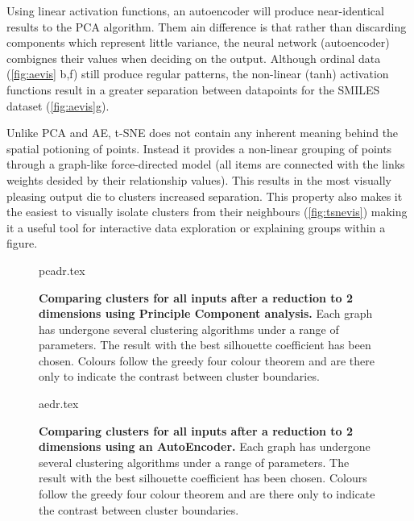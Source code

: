 Using linear activation functions, an autoencoder will produce near-identical results to the PCA algorithm. Them ain difference is that rather than discarding components which represent little variance, the neural network (autoencoder) combignes their values when deciding on the output. Although ordinal data (\autoref{fig:aevis} b,f) still produce regular patterns, the non-linear (tanh) activation functions result in a greater separation between datapoints for the SMILES dataset (\autoref{fig:aevis}g).

Unlike PCA and AE, t-SNE does not contain any inherent meaning behind the spatial potioning of points. Instead it provides a non-linear grouping of points through a graph-like force-directed model (all items are connected with the links weights desided by their relationship values). This results in the most visually pleasing output die to clusters increased separation. This property also  makes it the easiest to visually isolate clusters from their neighbours (\autoref{fig:tsnevis}) making it a useful tool for interactive data exploration or explaining groups within a figure.


\begin{landscape}
\begin{figure}[H]
    {pcadr.tex}
    \caption{\textbf{Comparing clusters for all inputs after a reduction to 2 dimensions using Principle Component analysis.}
    Each graph has undergone several clustering algorithms under a range of parameters. The result with the best silhouette coefficient has been chosen. Colours follow the greedy four colour theorem and are there only to indicate the contrast between cluster boundaries.}
    \label{fig:pcavis}
\end{figure}
\end{landscape}


\begin{landscape}
\begin{figure}[H]
    {aedr.tex}
    \caption{\textbf{Comparing clusters for all inputs after a reduction to 2 dimensions using an AutoEncoder.}
    Each graph has undergone several clustering algorithms under a range of parameters. The result with the best silhouette coefficient has been chosen. Colours follow the greedy four colour theorem and are there only to indicate the contrast between cluster boundaries.}
    \label{fig:aevis}
\end{figure}
\end{landscape}


